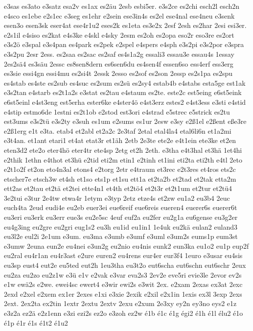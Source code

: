 {e3sas
es3ato
e3satz
esa2v
es1ax
es2äu
2esb
esbi5er.
e3s2ce
es2chi
esch2l
esch2n
e4sco
es1ebe
e2s1ec
e3seg
es1ehr
e2sein
ese3in4s
es2el
ese4nal
ese4neu
e3senk
esen3o
esen3sk
eser4at
ese4r1u2
eses2k
es1eta
es3e2x
2esf
2esh
es2har
2esi
esi3er.
e2s1il
e4siso
es2kat
e4s3ke
e4skl
e4sky
2esm
es2oh
es2opa
eso2r
eso3re
es2ort
e3s2ö
e3spal
e3s4pan
es4park
es2pek
e2spel
e4spers
e4sph
e3s2pi
e3s2por
e3spra
e3s2pu
2esr
2ess.
es2saa
es2sac
es2saf
es4s1a2g
essali3
essau3e
essau4s
1essay
2es2sä4
es3säu
2essc
es8sen8dern
es6sen6du
es4sen4f
essen6so
ess4erf
ess3erg
es3sie
essi4gn
essi4mu
es2si4t
2essk
2esso
es2sof
es2son
2essp
es2s1pa
es2spu
es4stab
es4ste
es2sub
es4suc
es2sum
es2sü
es2sy4
estab4b
e4stabs
esta5ge
est1ak
e3s2tan
e4starb
es2t1a2s
e3stat
es2tau
e4staum
es2te.
este2c
est5eing
e6st5eink
e6st5einl
e4st3eng
est5erha
ester6ke
e4ster4ö
e4st3erz
estes2
e4st3ess
e3sti
e4stid
e4stip
estmo6de
1estni
es2t1ob
e2stod
est3ori
e4strad
e5strec
e5strick
es2tu
est3ums
e3s2tü
e3s2ty
e3suh
es1um
e2sums
es1ur
2esw
e3sy
e2ß1el
e2ßent
eße3re
e2ß1erg
e1t
e3ta.
etab4
et2abl
et2a2c
2e3taf
2etal
etal4la4
etal6li6n
et1a2mi
e3t4an.
et1ant
etari1
et4at
etat3r
et1äh
2etb
2e3te
ete2e
e4t1ein
ete3ke
et2en
eten3d2
ete2o
eter4hö
eter4tr
ete4sp
2etg
et2h
2eth.
e3tha
e4t3hal
et3hä
1et4hi
e2thik
1ethn
e4thot
et3hü
e2tid
eti2m
etin1
e2tinh
et1ini
eti2ta
eti2th
e4tl
2eto
e2t1o2f
et2on
eto4n3al
etons4
e2torg
2etr
e4traum
et3rec
e2t3res
et4ros
ets2c
etscher7e
etsch3w
et4sh
et1so
ets1p
et1su
ett1a
et2ta2b
et2tad
et2tak
etta2m
ett2as
et2tau
et2tä
et2tei
ette4n1
et4th
et2tö4
et2t3r
et2t1um
et2tur
et2tü4
3e2tui
e3tur
2e4tw
etwa4r
1etym
e3typ
2etz
etze4s
et2zw
eu1a2
eu3b4
2euc
euch4ta
2eud
eudi4e
eu2eb
euer3ei
eue6reif
eue6reis
eueren4
euerer6s
euerer6t
eu3eri
eu3erk
eu3err
eue3s
eu2e5sc
4euf
euf2a
eu2fer
eu2g1a
eu6gense
eu3g2er
eu4g3ing
eu2gre
eu2gri
eug1s2
eu3h
eu1id
eu1in1
1e4uk
eu2kä
eulan2
euland3
eu3l2e
eul2i
2e1um
e3um.
eu3ma
e3umb
e3umf
e3uml
e3um2s
eums1p
eum3st
e3umw
2euna
eun2e
eu4nei
e3un2g
eu2nio
eu4nis
eunk2
eun3ka
eu1o2
eu1p
eup2f
eu2ral
eu4r1an
eu4r3ast
e2ure
euren2
eu4rens
eur4er
eur3f4
1euro
e3usar
eu4sis
eu3sp
eust4
eut2e
eu5ted
eut2h
1eu3tha
eu3t2o
eut6scha
eut6schn
eut6schr
2eux
eu2za
eu2zo
eu2z1w
e3ü
e1v
e2vak
e3var
eva2s3
2ev2e
eve5ri
evie3le
2evor
ev2s
e1w
ewä2s
e2we.
ewei4sc
ewert4
e3wir
ewi2s
e3wit
2ex.
e2xam
2exas
ex3at
2exc
2exd
e2xel
e2xem
ex1er
2exes
e1xi
e3xie
2exik
e2xil
e2x1in
1exis
ex3l
3exp
2exs
2ext.
2ex2ta
ex2tin
1extr
2extu
2extv
2exu
e2xum
2e3xy
ey2n
ey3no
eys2
e1z
e3z2a
ez2ä
e2z1enn
e3zi
ezi2s
ez2o
e3zoh
ez2w
é1b
é1c
é1g
égi2
é1h
é1l
élu2
é1o
é1p
é1r
é1s
é1t2
é1u2
}
